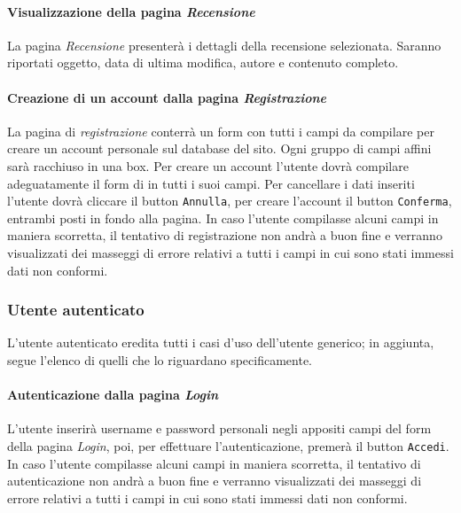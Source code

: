 \paragraph{Visualizzazione della pagina \textit{Recensione}}
\label{analisi-casi-uso-attori-principali-utente-generico-17}
La pagina \textit{Recensione} presenterà i dettagli della recensione selezionata. Saranno riportati oggetto, data di ultima modifica, autore e contenuto completo.


\paragraph{Creazione di un account dalla pagina \textit{Registrazione}}
\label{analisi-casi-uso-attori-principali-utente-generico-18}
La pagina di \textit{registrazione} conterrà un form con tutti i campi da compilare per creare un account personale sul database del sito. Ogni gruppo di campi affini sarà racchiuso in una box. Per creare un account l'utente dovrà compilare adeguatamente il form di in tutti i suoi campi. Per cancellare i dati inseriti l'utente dovrà cliccare il button \texttt{Annulla}, per creare l'account il button  \texttt{Conferma}, entrambi posti in fondo alla pagina. In caso l'utente compilasse alcuni campi in maniera scorretta, il tentativo di registrazione non andrà a buon fine e verranno visualizzati dei masseggi di errore relativi a tutti i campi in cui sono stati immessi dati non conformi.


\subsubsection{Utente autenticato}
\label{analisi-casi-uso-attori-principali-utente-autenticato}
L'utente autenticato eredita tutti i casi d'uso dell'utente generico; in aggiunta, segue l'elenco  di quelli che lo riguardano specificamente.


\paragraph{Autenticazione dalla pagina \textit{Login}}
\label{analisi-casi-uso-attori-principali-utente-autenticato-1}
L'utente inserirà username e password personali negli appositi campi del form della pagina \textit{Login}, poi, per effettuare l'autenticazione, premerà il button \texttt{Accedi}. In caso l'utente compilasse alcuni campi in maniera scorretta, il tentativo di autenticazione non andrà a buon fine e verranno visualizzati dei masseggi di errore relativi a tutti i campi in cui sono stati immessi dati non conformi.


